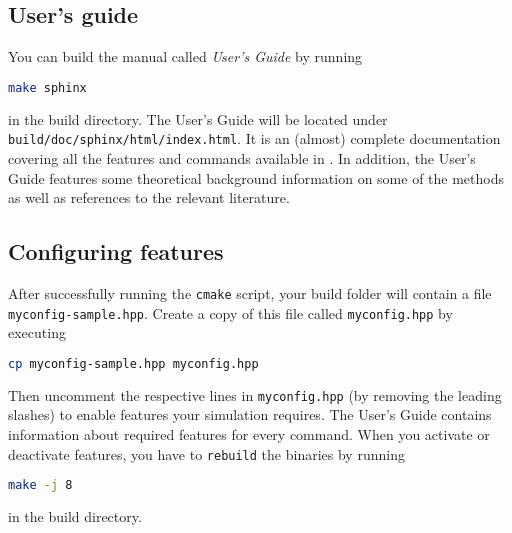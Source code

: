 \documentclass[
paper=a4,                       %
fontsize=11pt,                  %
headinclude=false,              %
footinclude=false,              %
pagesize,                       %
]{scrartcl}
\begin{document}
\subsection{User's guide}
You can build the \es{} manual called \emph{\es{} User's Guide} by running
\begin{lstlisting}[language=bash]
make sphinx
\end{lstlisting}
in the build directory. The User's Guide will be located under \texttt{build/doc/sphinx/html/index.html}. It is an (almost) complete documentation covering all the features and commands available in \es{}. In addition, the User's Guide features some theoretical background information on some of the methods as well as references to the relevant literature.

\subsection{Configuring features}
%
After successfully running the \verb!cmake! script, your build folder will contain a file \\ \texttt{myconfig-sample.hpp}. Create a copy of this file called \texttt{myconfig.hpp} by executing
\begin{lstlisting}[language=bash]
cp myconfig-sample.hpp myconfig.hpp
\end{lstlisting}
%
Then uncomment the respective lines in \texttt{myconfig.hpp} (by removing the leading slashes) to enable features your simulation requires. The User's Guide contains information about required features for every \es{} command.
When you activate or deactivate features, you have to \verb!rebuild! the binaries by running
%
\begin{lstlisting}[language=bash]
make -j 8
\end{lstlisting}
%
in the build directory.
\end{document}
